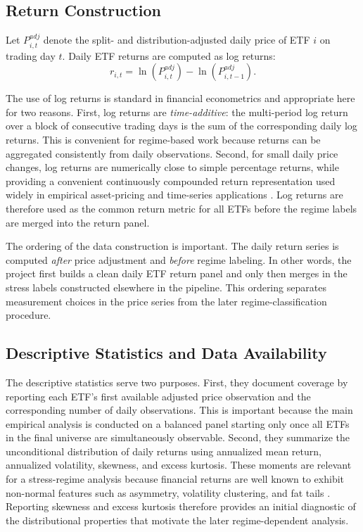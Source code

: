 \subsection{Return Construction}
\label{subsec:return_construction}

Let $P^{adj}_{i,t}$ denote the split- and distribution-adjusted daily price of ETF $i$ on trading day $t$. Daily ETF returns are computed as log returns:
\begin{equation}
r_{i,t} = \ln(P^{adj}_{i,t}) - \ln(P^{adj}_{i,t-1}).
\label{eq:logreturns}
\end{equation}

The use of log returns is standard in financial econometrics and appropriate here for two reasons. First, log returns are \emph{time-additive}: the multi-period log return over a block of consecutive trading days is the sum of the corresponding daily log returns. This is convenient for regime-based work because returns can be aggregated consistently from daily observations. Second, for small daily price changes, log returns are numerically close to simple percentage returns, while providing a convenient continuously compounded return representation used widely in empirical asset-pricing and time-series applications \citep{campbell_lo_mackinlay_1997,tsay2010analysis}. Log returns are therefore used as the common return metric for all ETFs before the regime labels are merged into the return panel.

The ordering of the data construction is important. The daily return series is computed \emph{after} price adjustment and \emph{before} regime labeling. In other words, the project first builds a clean daily ETF return panel and only then merges in the stress labels constructed elsewhere in the pipeline. This ordering separates measurement choices in the price series from the later regime-classification procedure.

\subsection{Descriptive Statistics and Data Availability}
\label{subsec:descriptive_statistics}

The descriptive statistics serve two purposes. First, they document coverage by reporting each ETF's first available adjusted price observation and the corresponding number of daily observations. This is important because the main empirical analysis is conducted on a balanced panel starting only once all ETFs in the final universe are simultaneously observable. Second, they summarize the unconditional distribution of daily returns using annualized mean return, annualized volatility, skewness, and excess kurtosis. These moments are relevant for a stress-regime analysis because financial returns are well known to exhibit non-normal features such as asymmetry, volatility clustering, and fat tails \citep{fama1965behavior,cont2001empirical}. Reporting skewness and excess kurtosis therefore provides an initial diagnostic of the distributional properties that motivate the later regime-dependent analysis.

